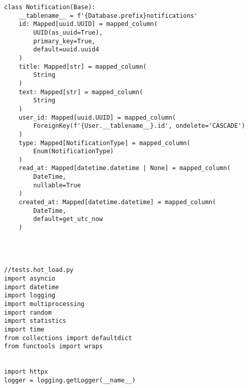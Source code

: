 \begin{lstlisting}
class Notification(Base):
    __tablename__ = f'{Database.prefix}notifications'
    id: Mapped[uuid.UUID] = mapped_column(
        UUID(as_uuid=True),
        primary_key=True,
        default=uuid.uuid4
    )
    title: Mapped[str] = mapped_column(
        String
    )
    text: Mapped[str] = mapped_column(
        String
    )
    user_id: Mapped[uuid.UUID] = mapped_column(
        ForeignKey(f'{User.__tablename__}.id', ondelete='CASCADE')
    )
    type: Mapped[NotificationType] = mapped_column(
        Enum(NotificationType)
    )
    read_at: Mapped[datetime.datetime | None] = mapped_column(
        DateTime,
        nullable=True
    )
    created_at: Mapped[datetime.datetime] = mapped_column(
        DateTime,
        default=get_utc_now
    )




//tests.hot_load.py
import asyncio
import datetime
import logging
import multiprocessing
import random
import statistics
import time
from collections import defaultdict
from functools import wraps


import httpx
logger = logging.getLogger(__name__)



\end{lstlisting}
